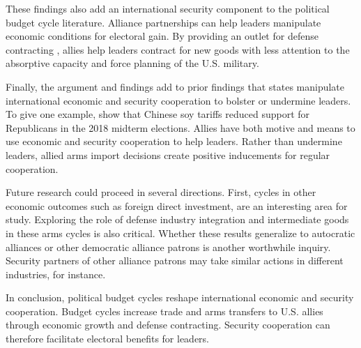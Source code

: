 \documentclass[12pt]{article}
\begin{document}
These findings also add an international security component to the political budget cycle literature.
Alliance partnerships can help leaders manipulate economic conditions for electoral gain. 
By providing an outlet for defense contracting , allies help leaders contract for new goods with less attention to the absorptive capacity and force planning of the U.S. military.


Finally, the argument and findings add to prior findings that states manipulate international economic and security cooperation to bolster or undermine leaders. 
To give one example, \citet{ChyzhUrbatsch2021} show that Chinese soy tariffs reduced support for Republicans in the 2018 midterm elections. 
Allies have both motive and means to use economic and security cooperation to help leaders. 
Rather than undermine leaders, allied arms import decisions create positive inducements for regular cooperation.


Future research could proceed in several directions. 
First, cycles in other economic outcomes such as foreign direct investment, are an interesting area for study. 
Exploring the role of defense industry integration and intermediate goods in these arms cycles is also critical.
Whether these results generalize to autocratic alliances or other democratic alliance patrons is another worthwhile inquiry. 
Security partners of other alliance patrons may take similar actions in different industries, for instance.


In conclusion, political budget cycles reshape international economic and security cooperation.
Budget cycles increase trade and arms transfers to U.S. allies through economic growth and defense contracting.
Security cooperation can therefore facilitate electoral benefits for leaders. 


\newpage
\singlespace
 
 
\end{document}
